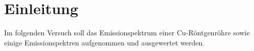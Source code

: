 \section{Einleitung}
\label{sec:einleitung}
Im folgenden Versuch soll das Emissionspektrum einer Cu-Röntgenröhre sowie einige
Emissionspektren aufgenommen und ausgewertet werden.
